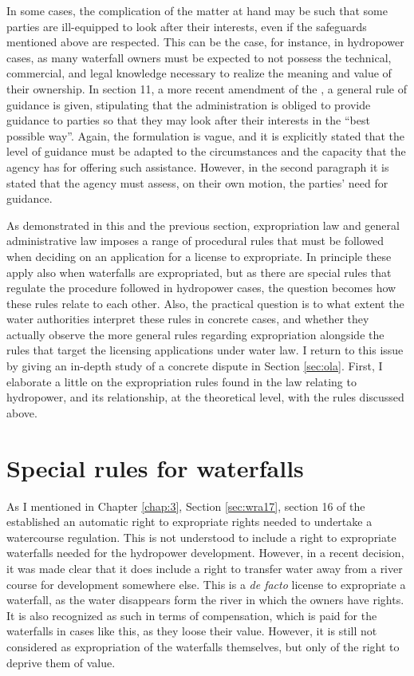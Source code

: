 In some cases, the complication of the matter at hand may be such that some parties are ill-equipped to look after their interests, even if the safeguards mentioned above are respected. This can be the case, for instance, in hydropower cases, as many waterfall owners must be expected to not possess the technical, commercial, and legal knowledge necessary to realize the meaning and value of their ownership. In section 11, a more recent amendment of the \cite{paa67}, a general rule of guidance is given, stipulating that the administration is obliged to provide guidance to parties so that they may look after their interests in the ``best possible way''. Again, the formulation is vague, and it is explicitly stated that the level of guidance must be adapted to the circumstances and the capacity that the agency has for offering such assistance. However, in the second paragraph it is stated that the agency must assess, on their own motion, the parties' need for guidance.

As demonstrated in this and the previous section, expropriation law and general administrative law imposes a range of procedural rules that must be followed when deciding on an application for a license to expropriate. In principle these apply also when waterfalls are expropriated, but as there are special rules that regulate the procedure followed in hydropower cases, the question becomes how these rules relate to each other. Also, the practical question is to what extent the water authorities interpret these rules in concrete cases, and whether they actually observe the more general rules regarding expropriation alongside the rules that target the licensing applications under water law. I return to this issue by giving an in-depth study of a concrete dispute in Section \ref{sec:ola}. First, I elaborate a little on the expropriation rules found in the law relating to hydropower, and its relationship, at the theoretical level, with the rules discussed above.

\section{Special rules for waterfalls}\label{sec:special}

As I mentioned in Chapter \ref{chap:3}, Section \ref{sec:wra17}, section 16 of the \cite{wra17} established an automatic right to expropriate rights needed to undertake a watercourse regulation. This is not understood to include a right to expropriate waterfalls needed for the hydropower development. However, in a recent decision, it was made clear that it does include a right to transfer water away from a river course for development somewhere else. This is a {\it de facto} license to expropriate a waterfall, as the water disappears form the river in which the owners have rights. It is also recognized as such in terms of compensation, which is paid for the waterfalls in cases like this, as they loose their value. However, it is still not considered as expropriation of the waterfalls themselves, but only of the right to deprive them of value.

